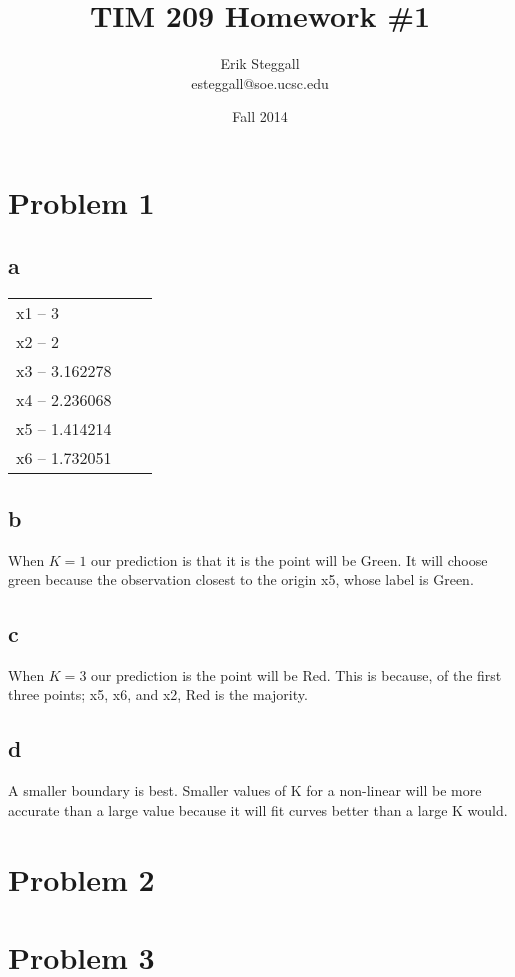 \documentclass{article}
\title{TIM 209 Homework \#1}
\author{Erik Steggall\\ esteggall@soe.ucsc.edu}
\date{Fall 2014}
\begin{document}
 \maketitle \pagestyle{empty}
\section*{Problem 1}
\subsection*{a}

\begin{tabular}{ l c r }
x1 -- 3\\
x2 -- 2\\
x3 -- 3.162278\\
x4 -- 2.236068\\
x5 -- 1.414214\\
x6 -- 1.732051\\
\end{tabular}
\subsection*{b}
When $K=1$ our prediction is that it is the point will be Green. It will choose green because the observation closest to the origin x5, whose label is Green.\\
\subsection*{c}
When $K=3$ our prediction is the point will be Red. This is because, of the first three points; x5, x6, and x2, Red is the majority.\\
\subsection*{d}
A smaller boundary is best. Smaller values of K for a non-linear will be more accurate than a large value because it will fit curves better than a large K would.

\section*{Problem 2}



\section*{Problem 3}
\end{document}
